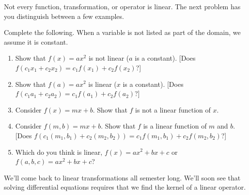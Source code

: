 Not every function, transformation, or operator is linear. The next problem has you distinguish between a few examples.
\begin{problem}
 Complete the following. When a variable is not listed as part of the domain, we assume it is constant. 
\begin{enumerate}
 \item Show that $f(x)=ax^2$ is not linear ($a$ is a constant). [Does $f(c_1x_1+c_2x_2) = c_1f(x_1)+c_2f(x_2)$?]
 \item Show that $f(a)=ax^2$ is linear ($x$ is a constant). [Does $f(c_1a_1+c_2a_2) = c_1f(a_1)+c_2f(a_2)$?]
 \item Consider $f(x)=mx+b$. Show that $f$ is not a linear function of $x$. %
 \item Consider $f(m,b)=mx+b$.  Show that $f$ is a linear function of $m$ and $b$. 
[Does $f(c_1(m_1,b_1)+c_2(m_2,b_2)) = c_1f(m_1,b_1)+c_2f(m_2,b_2)$?]
 \item {}%
Which do you think is linear, $f(x) = ax^2+bx+c$ or $f(a,b,c) = ax^2+bx+c$?
\end{enumerate}

\end{problem}
  

We'll come back to linear transformations all semester long.  We'll soon see that solving differential equations requires that we find the kernel of a linear operator. 

















